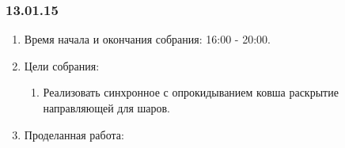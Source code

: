 \subsubsection{13.01.15}
\begin{enumerate}
	
	\item Время начала и окончания собрания: 16:00 - 20:00.
	
	\item Цели собрания: 
	\begin{enumerate}
		
		\item Реализовать синхронное с опрокидыванием ковша раскрытие направляющей для шаров.
		
	\end{enumerate}

	\item Проделанная работа:
	\begin{enumerate}
		

\end{enumerate}
\end{enumerate}
